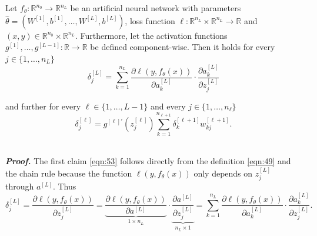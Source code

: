 \begin{theorem}[Backpropagation]\label{backpropagation}
Let $f_{\theta}: \mathbb{R}^{n_0} \rightarrow \mathbb{R}^{n_L}$ be an artificial neural network with parameters $\hat{\theta} = (W^{[1]}, b^{[1]}, \ldots, W^{[L]}, b^{[L]})$, loss function $\ell: \mathbb{R}^{n_L} \times \mathbb{R}^{n_L} \rightarrow \mathbb{R}$ and $(x, y) \in \mathbb{R}^{n_0} \times \mathbb{R}^{n_L}$. Furthermore, let the activation functions $g^{[1]}, \ldots, g^{[L-1]}: \mathbb{R} \rightarrow \mathbb{R}$ be defined component-wise. Then it holds for every $j \in \{1, \ldots, n_L\}$
\begin{equation}
    \delta_j^{[L]} = \sum_{k=1}^{n_L} \frac{\partial \ell(y, f_\theta(x))}{\partial a_k^{[L]}} \cdot \frac{\partial a_k^{[L]}}{\partial z_j^{[L]}}
    \label{eqn:53}
\end{equation}

and further for every $\ell \in \{1, \ldots, L-1\}$ and every $j \in \{1, \ldots, n_{\ell}\}$
\begin{equation}
    \delta_j^{[\ell]} = g^{[\ell]'}(z_j^{[\ell]}) \sum_{k=1}^{n_{\ell+1}} \delta_k^{[\ell+1]} w_{kj}^{[\ell+1]}.
    \label{eqn:54}
\end{equation}
\end{theorem}\\

\textbf{\emph{Proof.}} The first claim \ref{eqn:53} follows directly from the definition \ref{eqn:49} and the chain rule because the function $\ell(y, f_{\theta}(x))$ only depends on $z_j^{[L]}$ through $a^{[L]}$. Thus
\begin{equation}
    \delta_j^{[L]} = \frac{\partial \ell(y, f_\theta(x))}{\partial z_j^{[L]}} = \underbrace{\frac{\partial \ell(y, f_\theta(x))}{\partial a^{[L]}}}_{1 \times n_L} \cdot \underbrace{\frac{\partial a^{[L]}}{\partial z_j^{[L]}}}_{n_L \times 1} = \sum_{k=1}^{n_L} \frac{\partial \ell(y, f_\theta(x))}{\partial a_k^{[L]}} \cdot \frac{\partial a_k^{[L]}}{\partial z_j^{[L]}}.
    \label{eqn:55}
\end{equation}

